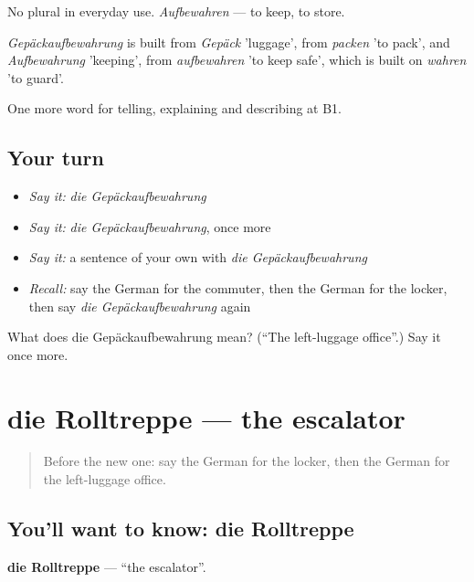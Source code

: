 No plural in everyday use. \emph{Aufbewahren} — to keep, to store.

\begin{cousinweb}
\emph{Gepäckaufbewahrung} is built from \emph{Gepäck} 'luggage', from \emph{packen} 'to pack', and \emph{Aufbewahrung} 'keeping', from \emph{aufbewahren} 'to keep safe', which is built on \emph{wahren} 'to guard'.
\end{cousinweb}

\begin{grammarlens}[title={What you've built}]
One more word for telling, explaining and describing at B1.
\end{grammarlens}

\subsection*{Your turn}
\begin{itemize}
\raggedright
  \item \emph{Say it:} \emph{die Gepäckaufbewahrung}
  \item \emph{Say it:} \emph{die Gepäckaufbewahrung}, once more
  \item \emph{Say it:} a sentence of your own with \emph{die Gepäckaufbewahrung}
  \item \emph{Recall:} say the German for the commuter, then the German for the locker, then say \emph{die Gepäckaufbewahrung} again
\end{itemize}

\begin{tcolorbox}[breakable,colback=teal!4,colframe=teal!35!black,title={Before you move on}]
What does die Gepäckaufbewahrung mean? (\textquotedblleft{}The left-luggage office\textquotedblright{}.) Say it once more.
\end{tcolorbox}
\section[die Rolltreppe]{die Rolltreppe — the escalator}

\label{lesson:GE-C415-rolltreppe}



\begin{quote}
Before the new one: say the German for the locker, then the German for the left-luggage office.
\end{quote}

\subsection*{You'll want to know: die Rolltreppe}
\textbf{die Rolltreppe} — \textquotedblleft{}the escalator\textquotedblright{}.


